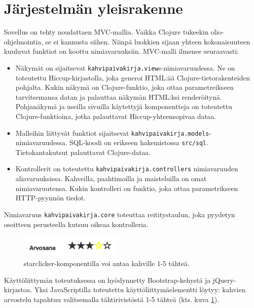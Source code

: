 \documentclass[a4paper,titlepage]{article}
\begin{document}
\section{Järjestelmän yleisrakenne}

Sovellus on tehty noudattaen MVC-mallia.  Vaikka Clojure tukeekin
olio-ohjelmointia, se ei kannusta siihen.  Niinpä luokkien sijaan
yhteen kokonaisuuteen kuuluvat funktiot on koottu nimiavaruuksiin.
MVC-malli ilmenee seuraavasti:

\begin{itemize}
    \item Näkymät on sijaitsevat
      \texttt{kahvipaivakirja.view}s-nimiavaruudessa. Ne on toteutettu
      Hiccup-kirjastolla, joka generoi HTML:ää
      Clojure-tietorakenteiden pohjalta. Kukin näkymä on
      Clojure-funktio, joka ottaa parametreikseen tarvitsemansa datan
      ja palauttaa näkymän HTML:ksi renderöitynä. Pohjanäkymä ja
      useilla sivuilla käytettyjä komponentteja on toteutettu
      Clojure-funktioina, jotka palauttavat Hiccup-yhteensopivaa
      dataa.

    \item Malleihin liittyvät funktiot sijaitsevat
      \texttt{kahvipaivakirja.models}-nimiavaruudessa. SQL-koodi on
      erikseen hakemistossa \texttt{src/sql}. Tietokantakutsut
      palauttavat Clojure-dataa.

    \item Kontrollerit on toteutettu
      \texttt{kahvipaivakirja.controllers} nimiavaruuden
      aliavaruuksissa. Kahveilla, paahtimoilla ja maisteluilla on omat
      nimiavaruutensa. Kukin kontrolleri on funktio, joka ottaa
      parametrikseen HTTP-pyynnön tiedot.
\end{itemize}

Nimiavaruus \texttt{kahvipaivakirja.core} toteuttaa reititystaulun,
joka pyydetyn osoitteen perusteella kutsuu oikeaa kontrolleria.

\begin{figure}[t]
  \includegraphics[width=5cm]{starclicker.png}
  \caption{starclicker-komponentilla voi antaa kahville 1-5 tähteä.}
  \label{fig:starclicker}
\end{figure}

Käyttöliittymän toteutuksessa on hyödynnetty Bootstrap-kehystä ja
jQuery-kirjastoa. Yksi JavaScriptilla toteutettu
käyttöliittymäelementti löytyy: kahvien arvostelu tapahtuu
valitsemalla tähtirivistöstä 1-5 tähteä (kts. kuva \ref{fig:starclicker}).
\end{document}
